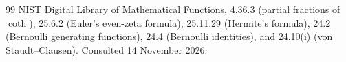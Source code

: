 \begin{thebibliography}{99}
NIST Digital Library of Mathematical Functions,
\href{https://dlmf.nist.gov/4.36.E3}{4.36.3} (partial fractions of \(\coth\)),
\href{https://dlmf.nist.gov/25.6.E2}{25.6.2} (Euler's even-zeta formula),
\href{https://dlmf.nist.gov/25.11.E29}{25.11.29} (Hermite's formula),
\href{https://dlmf.nist.gov/24.2}{24.2} (Bernoulli generating functions),
\href{https://dlmf.nist.gov/24.4}{24.4} (Bernoulli identities), and
\href{https://dlmf.nist.gov/24.10.i}{24.10(i)}
(von Staudt--Clausen). Consulted 14 November 2026.

\end{thebibliography}
